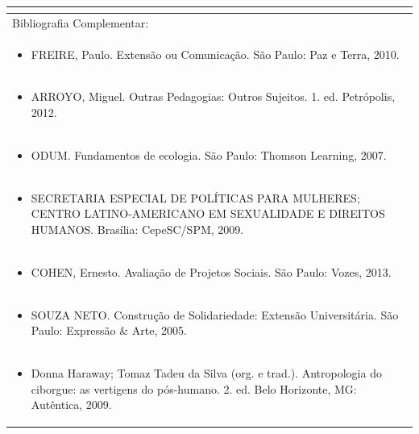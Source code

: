 \documentclass[11pt]{article}
\begin{document}
\begin{center}
\begin{longtable}{|p{4cm}|p{4cm}|p{4cm}|p{4cm}|}
\multicolumn{4}{|p{16cm}|}{}\\
\hline
\multicolumn{4}{|p{16cm}|}{Bibliografia Complementar:}\\*
\multicolumn{4}{|p{\dimexpr 16cm + 6\tabcolsep\relax}|}{\begin{itemize}\item FREIRE, Paulo. Extensão ou Comunicação. São Paulo: Paz e Terra, 2010.\end{itemize}}\\
\multicolumn{4}{|p{\dimexpr 16cm + 6\tabcolsep\relax}|}{\begin{itemize}\item ARROYO, Miguel. Outras Pedagogias: Outros Sujeitos. 1. ed. Petrópolis, 2012.\end{itemize}}\\
\multicolumn{4}{|p{\dimexpr 16cm + 6\tabcolsep\relax}|}{\begin{itemize}\item ODUM. Fundamentos de ecologia. São Paulo: Thomson Learning, 2007.\end{itemize}}\\
\multicolumn{4}{|p{\dimexpr 16cm + 6\tabcolsep\relax}|}{\begin{itemize}\item SECRETARIA ESPECIAL DE POLÍTICAS PARA MULHERES; CENTRO LATINO-AMERICANO EM SEXUALIDADE E DIREITOS HUMANOS. Brasília: CepeSC/SPM, 2009.\end{itemize}}\\
\multicolumn{4}{|p{\dimexpr 16cm + 6\tabcolsep\relax}|}{\begin{itemize}\item COHEN, Ernesto. Avaliação de Projetos Sociais. São Paulo: Vozes, 2013.\end{itemize}}\\
\multicolumn{4}{|p{\dimexpr 16cm + 6\tabcolsep\relax}|}{\begin{itemize}\item SOUZA NETO. Construção de Solidariedade: Extensão Universitária. São Paulo: Expressão \& Arte, 2005.\end{itemize}}\\
\multicolumn{4}{|p{\dimexpr 16cm + 6\tabcolsep\relax}|}{\begin{itemize}\item Donna Haraway; Tomaz Tadeu da Silva (org. e trad.). Antropologia do ciborgue: as vertigens do pós-humano. 2. ed. Belo Horizonte, MG: Autêntica, 2009.\end{itemize}}\\
\hline
\end{longtable}
\end{center}
\end{document}
